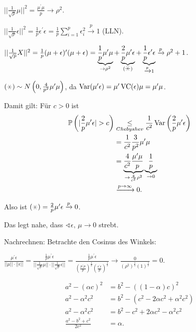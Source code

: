 \documentclass{tstextbook}
\begin{document}
	$ ||\frac{1}{\sqrt{p}}\mu||^2 = \frac{\mu^\prime\mu}{p} \rightarrow \rho^2 $. 
	
	$ ||\frac{1}{\sqrt{p}}\epsilon||^2 = \frac{1}{p}\epsilon^\prime\epsilon = \frac{1}{p}\sum_{i=1}^{p}\epsilon_i^2 \xrightarrow{p} 1 $ (LLN).
	
	$ ||\frac{1}{\sqrt{p}}X||^2 = \frac{1}{p}(\mu+\epsilon)^\prime(\mu+\epsilon) = \underbrace{\frac{1}{p}\mu^\prime\mu}_{\to\rho^2} + \underbrace{\frac{2}{p}\mu^\prime\epsilon}_{(\hexstar)} + \underbrace{\frac{1}{p}\epsilon^\prime\epsilon}_{\xrightarrow{p}1} \xrightarrow{p} \rho^2 +1 $.
	
	$ (\hexstar) \sim N\left(0,\frac{4}{p^2}\mu^\prime\mu\right) $, da $ \operatorname{Var}(\mu^\prime\epsilon)=\mu^\prime \operatorname{VC}(\epsilon)\mu = \mu^\prime\mu $.
	
	Damit gilt: Für $ c>0 $ ist 
	\[
	\begin{aligned}
		\Prob\left(|\frac{2}{p}\mu^\prime\epsilon|>c\right) & \underset{Chebyshev}{\le} \frac{1}{c^2}\Var\left(\frac{2}{p}\mu^\prime\epsilon\right) \\
		& = \frac{1}{c^2}\frac{3}{p^2}\mu^\prime\mu \\
		& = \underbrace{\frac{4}{c^2}\frac{\mu^\prime\mu}{p}}_{\to \frac{4}{c^2}\rho^2} \underbrace{\frac{1}{p}}_{\to 0} \\
		& \xrightarrow{p\to\infty} 0.
	\end{aligned}
	\] 
	
	Also ist $ (\hexstar) = \frac{2}{p}\mu^\prime\epsilon \xrightarrow{p} 0 $. 
	
	Das legt nahe, dass $ \sphericalangle \epsilon, \, \mu \to 0 $ strebt.
	
	Nachrechnen: Betrachte den Cosinus des Winkels: 
	
	$ \frac{\mu^\prime\epsilon}{||\mu||\cdot||\epsilon||} = \frac{\frac{1}{p}\mu^\prime\epsilon}{||\frac{1}{\sqrt{p}}\mu||\cdot||\frac{1}{\sqrt{p}}\epsilon||} = \frac{\frac{1}{p}\mu^\prime \epsilon}{\left(\frac{\mu^\prime\mu}{p}\right)^{\frac{1}{2}}\left(\frac{\epsilon^\prime \epsilon}{p}\right)^{\frac{1}{2}}} \rightarrow \frac{0}{(\rho^2)^{\frac{1}{2}}(1)^{\frac{1}{2}}} = 0 $.
	
	\[
	\begin{aligned}
		a^2-(\alpha c)^2 & = b^2 - ((1-\alpha)c)^2 \\
		a^2-\alpha^2c^2 & = b^2 -(c^2-2\alpha c^2+\alpha^2c^2) \\
		a^2-\alpha^2c^2 & = b^2-c^2+2\alpha c^2 - \alpha^2c^2 \\
		\frac{a^2-b^2+c^2}{2c^2} & = \alpha.
	\end{aligned}
	\]
	
\end{document}
